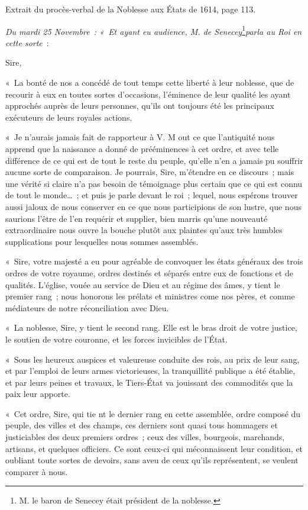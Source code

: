 \documentclass[french,twoside]{book} %
\begin{document}
\noindent Extrait du procès-verbal de la Noblesse aux États de 1614, page 113.\par
{\itshape Du mardi 25 Novembre : « Et ayant eu audience, M. de Senecey}\footnote{M. le baron de Senecey était président de la noblesse.}{\itshape  parla au Roi en cette sorte} : \par
\par
Sire,\par
« La bonté de nos a concédé de tout temps cette liberté à leur noblesse, que de recourir à eux en toutes sortes d’occasions, l’éminence de leur qualité les ayant approchés auprès de leurs personnes, qu’ils ont toujours été les principaux exécuteurs de leurs royales actions.\par
« Je n’aurais jamais fait de rapporteur à V. M out ce que l’antiquité nous apprend que la naissance a donné de prééminences à cet ordre, et avec telle différence de ce qui est de tout le reste du peuple, qu’elle n’en a jamais pu souffrir aucune sorte de comparaison. Je pourrais, Sire, m’étendre en ce discours ; mais une vérité si claire n’a pas besoin de témoignage plus certain que ce qui est connu de tout le monde… ; et puis je parle devant le roi ; lequel, nous espérons trouver aussi jaloux de nous conserver en ce que nous participions de son lustre, que nous saurions l’être de l’en requérir et supplier, bien marris qu’une nouveauté extraordinaire nous ouvre la bouche plutôt aux plaintes qu’aux très humbles supplications pour lesquelles nous sommes assemblés.\par
« Sire, votre majesté a eu pour agréable de convoquer les états généraux des trois ordres de votre royaume, ordres destinés et séparés entre eux de fonctions et de qualités. L’église, vouée au service de Dieu et au régime des âmes, y tient le premier rang ; nous honorons les prélats et ministres come nos pères, et comme médiateurs de notre réconciliation avec Dieu.\par
« La noblesse, Sire, y tient le second rang. Elle est le bras droit de votre justice, le soutien de votre couronne, et les forces invicibles de l’État.\par
« Sous les heureux auspices et valeureuse conduite des rois, au prix de leur sang, et par l’emploi de leurs armes victorieuses, la tranquillité publique a été établie, et par leurs peines et travaux, le Tiers-État va jouissant des commodités que la paix leur apporte.\par
« Cet ordre, Sire, qui tie
\label{\_GoBack}nt le dernier rang en cette assemblée, ordre composé du peuple, des villes et des champs, ces derniers sont quasi tous hommagers et justiciables des deux premiers ordres ; ceux des villes, bourgeois, marchands, artisans, et quelques officiers. Ce sont ceux-ci qui méconnaissent leur condition, et oubliant toute sortes de devoirs, sans aveu de ceux qu’ils représentent, se veulent comparer à nous.\par
\end{document}
